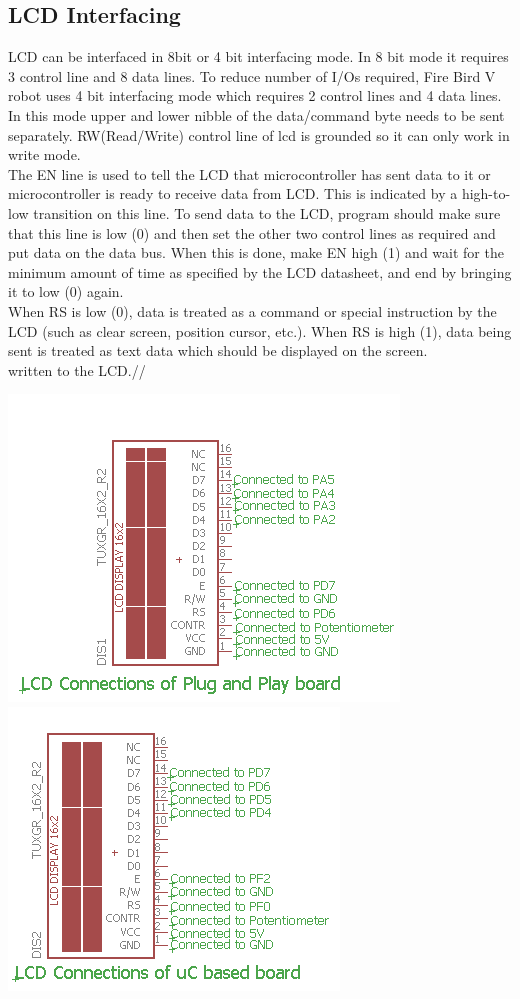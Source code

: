 \documentclass[a4paper,12pt,oneside]{article}
\begin{document}
{	\subsection{\textbf{LCD Interfacing}}{
	LCD can be interfaced in 8bit or 4 bit interfacing mode. In 8 bit mode it requires 3 control line
	and 8 data lines. To reduce number of I/Os required, Fire Bird V robot uses 4 bit interfacing
	mode which requires 2 control lines and 4 data lines. In this mode upper and lower nibble of the
	data/command byte needs to be sent separately. RW(Read/Write) control line of lcd is grounded so it can only work in write mode.\\
	The EN line is used to tell the LCD that microcontroller
	has sent data to it or microcontroller is ready to receive data from LCD. This is indicated by a
	high-to-low transition on this line. To send data to the LCD, program should make sure that this
	line is low (0) and then set the other two control lines as required and put data on the data bus.
	When this is done, make EN high (1) and wait for the minimum amount of time as specified by
	the LCD datasheet, and end by bringing it to low (0) again.\\
	When RS is low (0), data is treated as a command or special
	instruction by the LCD (such as clear screen, position cursor, etc.). When RS is high (1), data
	being sent is treated as text data which should be displayed on the screen.\\
	written to the LCD.//}
		\begin{center}
		\includegraphics{Images/lcdPlug}\\
		\includegraphics{Images/lcduC}\\

\end{center}}
\end{document}
